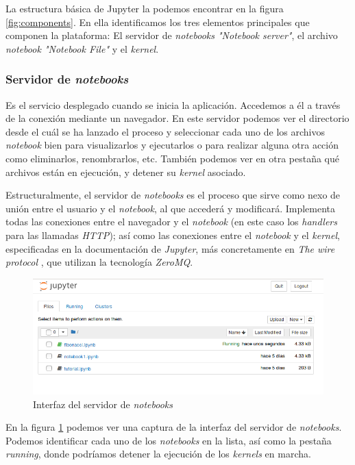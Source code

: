 \documentclass[11pt,spanish,listoffigures]{tfgetsinf}
\begin{document}
La estructura básica de Jupyter la podemos encontrar en la figura \ref{fig:components}. En ella identificamos los tres elementos principales que componen la plataforma: El servidor de \textit{notebooks "Notebook server"}, el archivo \textit{notebook "Notebook File"} y el \textit{kernel}. 


\subsubsection{Servidor de \textit{notebooks}}
\label{subsec:estructura-servidor}

Es el servicio desplegado cuando se inicia la aplicación. Accedemos a él a través de la conexión mediante un navegador. En este servidor podemos ver el directorio desde el cuál se ha lanzado el proceso y seleccionar cada uno de los archivos \textit{notebook} bien para visualizarlos y ejecutarlos o para realizar alguna otra acción como eliminarlos, renombrarlos, etc.
 También podemos ver en otra pestaña qué archivos están en ejecución, y detener su \textit{kernel} asociado.
 
Estructuralmente, el servidor de \textit{notebooks} es el proceso que sirve como nexo de unión entre el usuario y el \textit{notebook}, al que accederá y modificará. Implementa todas las conexiones entre el navegador y el \textit{notebook} (en este caso los \textit{\gls{handler}s} para las llamadas \textit{\gls{HTTP}}); así como las conexiones entre el \textit{notebook} y el \textit{kernel}, especificadas en la documentación de \textit{Jupyter}, más concretamente en \textit{The wire protocol} \cite{wire-protocol}, que utilizan la tecnología \textit{ZeroMQ}.

\begin{figure}[h]
	\centering
  	\includegraphics[width=\linewidth]{tree.png}
  	\caption{Interfaz del servidor de \textit{notebooks}}
  	\label{fig:tree}
\end{figure}

En la figura \ref{fig:tree} podemos ver una captura de la interfaz del servidor de \textit{notebooks}. Podemos identificar cada uno de los \textit{notebooks} en la lista, así como la pestaña \textit{running}, donde podríamos detener la ejecución de los \textit{kernels} en marcha.
\end{document}
